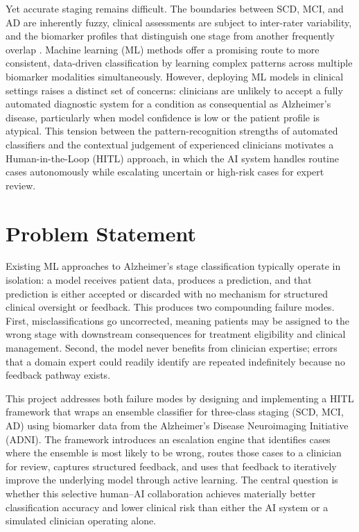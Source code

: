 \documentclass[12pt, a4paper]{report}
\begin{document}
  Yet accurate staging remains difficult. The boundaries between SCD, MCI, and AD
  are inherently fuzzy, clinical assessments are subject to inter-rater variability,
  and the biomarker profiles that distinguish one stage from another frequently
  overlap \citep{edmonds2015mci}. Machine learning (ML) methods offer a promising
  route to more consistent, data-driven classification by learning complex patterns
  across multiple biomarker modalities simultaneously. However, deploying ML models
  in clinical settings raises a distinct set of concerns: clinicians are unlikely to
  accept a fully automated diagnostic system for a condition as consequential as
  Alzheimer's disease, particularly when model confidence is low or the patient
  profile is atypical. This tension between the pattern-recognition strengths of
  automated classifiers and the contextual judgement of experienced clinicians
  motivates a Human-in-the-Loop (HITL) approach, in which the AI system handles
  routine cases autonomously while escalating uncertain or high-risk cases for
  expert review.

  \section{Problem Statement}
  \label{sec:problem}

  Existing ML approaches to Alzheimer's stage classification typically operate in
  isolation: a model receives patient data, produces a prediction, and that
  prediction is either accepted or discarded with no mechanism for structured clinical
  oversight or feedback. This produces two compounding failure modes. First,
  misclassifications go uncorrected, meaning patients may be assigned to the wrong
  stage with downstream consequences for treatment eligibility and clinical
  management. Second, the model never benefits from clinician expertise; errors that
  a domain expert could readily identify are repeated indefinitely because no feedback
  pathway exists.

  This project addresses both failure modes by designing and implementing a HITL
  framework that wraps an ensemble classifier for three-class staging (SCD, MCI, AD)
  using biomarker data from the Alzheimer's Disease Neuroimaging Initiative (ADNI).
  The framework introduces an escalation engine that identifies cases where the
  ensemble is most likely to be wrong, routes those cases to a clinician for review,
  captures structured feedback, and uses that feedback to iteratively improve the
  underlying model through active learning. The central question is whether this
  selective human--AI collaboration achieves materially better classification accuracy
  and lower clinical risk than either the AI system or a simulated clinician
  operating alone.
\end{document}
